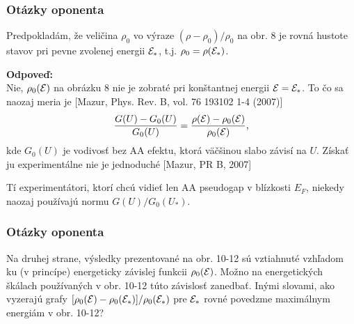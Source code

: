 \documentclass[
	11pt, %
]{beamer}
\begin{document}
\begin{frame}
\frametitle{Otázky oponenta}
Predpokladám, že veličina $\rho_0$ vo výraze $(\rho - \rho_0)/\rho_0$ na obr. 8 je rovná hustote stavov
pri pevne zvolenej energii $\mathcal{E}_*$, t.j. $\rho_0 = \rho(\mathcal{E}_*)$.

\vspace{5mm}
\textbf{Odpoveď:}\\
Nie, $\rho_0(\mathcal{E})$ na obrázku 8 nie je zobraté pri konštantnej energii $\mathcal{E}=\mathcal{E}_*$. To čo sa naozaj meria je [Mazur, Phys. Rev. B, vol. 76 193102 1-4 (2007)] $$\frac{G(U)-G_0(U)}{G_0(U)}=\frac{\rho(\mathcal{E})-\rho_0(\mathcal{E})}{\rho_0(\mathcal{E})}\text{,}$$
kde $G_0(U)$ je vodivosť bez AA efektu, ktorá väčšinou slabo závisí na $U$. Získať ju experimentálne nie je jednoduché [Mazur, PR B, 2007]
\vspace{5mm}
 
Tí experimentátori, ktorí chcú vidieť len AA pseudogap v blízkosti $E_F$, niekedy naozaj používajú normu $G(U)/G_0(U_*)$. 
\end{frame}
\begin{frame}
\frametitle{Otázky oponenta}

 Na druhej strane, výsledky prezentované na obr. 10-12 sú vztiahnuté vzhľadom ku (v princípe) energeticky závislej funkcii
$\rho_0(\mathcal{E})$. Možno na energetických škálach používaných v obr. 10-12 túto závislosť zanedbať. Inými slovami, ako vyzerajú grafy $[\rho_0(\mathcal{E})-\rho_0(\mathcal{E}_*)]/\rho_0(\mathcal{E}_*)$ pre $\mathcal{E}_*$ rovné povedzme
maximálnym energiám v obr. 10-12?
\end{frame}
\end{document}
